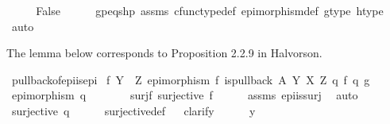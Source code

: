 \begin{isabellebody}
\isamarkupfalse%
\isanewline
\ \ \isamarkupfalse%
\ \isamarkupfalse%
\ False\isanewline
\ \ \ \ \isamarkupfalse%
\ gp{\isacharunderscore}{\kern0pt}eqs{\isacharunderscore}{\kern0pt}hp\ assms\ cfunc{\isacharunderscore}{\kern0pt}type{\isacharunderscore}{\kern0pt}def\ epimorphism{\isacharunderscore}{\kern0pt}def\ g{\isacharunderscore}{\kern0pt}type\ h{\isacharunderscore}{\kern0pt}type\ \isamarkupfalse%
\ auto\isanewline
{}\isamarkupfalse%
%
\endisatagproof
{\isafoldproof}%
%
\isadelimproof
%
\endisadelimproof
%
\begin{isamarkuptext}%
The lemma below corresponds to Proposition 2.2.9 in Halvorson.%
\end{isamarkuptext}\isamarkuptrue%
\isamarkupfalse%
\ pullback{\isacharunderscore}{\kern0pt}of{\isacharunderscore}{\kern0pt}epi{\isacharunderscore}{\kern0pt}is{\isacharunderscore}{\kern0pt}epi{}{\isacharcolon}{\kern0pt}\isanewline
{}\ {\isachardoublequoteopen}f{\isacharcolon}{\kern0pt}\ Y\ {\isasymrightarrow}\ Z{\isachardoublequoteclose}\ {\isachardoublequoteopen}epimorphism\ f{\isachardoublequoteclose}\ {\isachardoublequoteopen}is{\isacharunderscore}{\kern0pt}pullback\ A\ Y\ X\ Z\ q{}\ f\ q{}\ g{\isachardoublequoteclose}\isanewline
{}\ {\isachardoublequoteopen}epimorphism\ q{}{\isachardoublequoteclose}\ \isanewline
%
\isadelimproof
%
\endisadelimproof
%
\isatagproof
{}\isamarkupfalse%
\ {\isacharminus}{\kern0pt}\ \isanewline
\ \ \isamarkupfalse%
\ surj{\isacharunderscore}{\kern0pt}f{\isacharcolon}{\kern0pt}\ {\isachardoublequoteopen}surjective\ f{\isachardoublequoteclose}\isanewline
\ \ \ \ \isamarkupfalse%
\ assms{\isacharparenleft}{\kern0pt}{}{\isacharcomma}{\kern0pt}{}{\isacharparenright}{\kern0pt}\ epi{\isacharunderscore}{\kern0pt}is{\isacharunderscore}{\kern0pt}surj\ \isamarkupfalse%
\ auto\isanewline
\ \ \isamarkupfalse%
\ {\isachardoublequoteopen}surjective\ {\isacharparenleft}{\kern0pt}q{}{\isacharparenright}{\kern0pt}{\isachardoublequoteclose}\isanewline
\ \ \ \ \isamarkupfalse%
\ surjective{\isacharunderscore}{\kern0pt}def\isanewline
\ \ \isamarkupfalse%
{\isacharparenleft}{\kern0pt}clarify{\isacharparenright}{\kern0pt}\isanewline
\ \ \ \ \isamarkupfalse%
\ y\isanewline
\ \ \ \ \isamarkupfalse%

\end{isabellebody}
